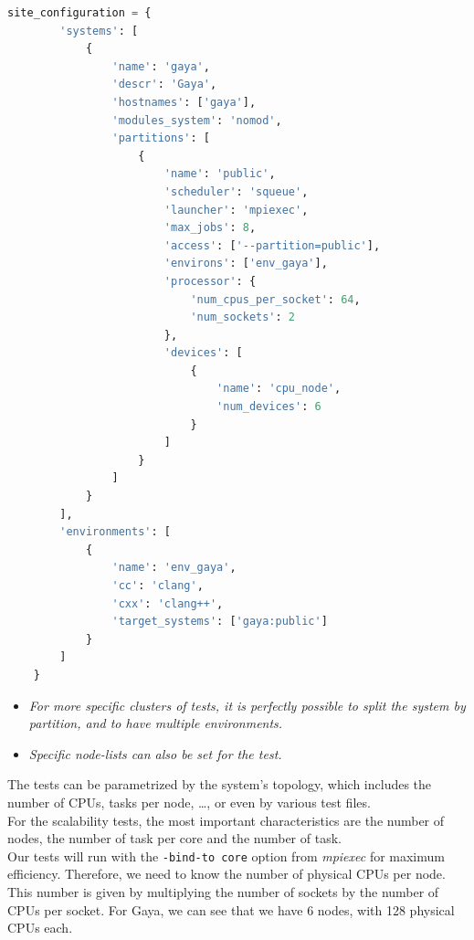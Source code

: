\documentclass[12pt]{article}
\begin{document}
\begin{lstlisting}[language=python,caption={Gaya configuration}]
site_configuration = {
        'systems': [
            {
                'name': 'gaya',
                'descr': 'Gaya',
                'hostnames': ['gaya'],
                'modules_system': 'nomod',
                'partitions': [
                    {
                        'name': 'public',
                        'scheduler': 'squeue',
                        'launcher': 'mpiexec',
                        'max_jobs': 8,
                        'access': ['--partition=public'],
                        'environs': ['env_gaya'],
                        'processor': {
                            'num_cpus_per_socket': 64,
                            'num_sockets': 2
                        },
                        'devices': [
                            {
                                'name': 'cpu_node',
                                'num_devices': 6
                            }
                        ]
                    }
                ]
            }
        ],
        'environments': [
            {
                'name': 'env_gaya',
                'cc': 'clang',
                'cxx': 'clang++',
                'target_systems': ['gaya:public']
            }
        ]
    }
\end{lstlisting}

\begin{itemize}[left=1cm]
    \item \textit{For more specific clusters of tests, it is perfectly possible to split the system by partition, and to have multiple environments.}
    \item \textit{Specific node-lists can also be set for the test.}
\end{itemize}

The tests can be parametrized by the system's topology, which includes the number of CPUs, tasks per node, \ldots, or even by various test files. \\
For the scalability tests, the most important characteristics are the number of nodes, the number of task per core and the number of task. \\

Our tests will run with the \texttt{-bind-to core} option from \textit{mpiexec} for maximum efficiency.
Therefore, we need to know the number of physical CPUs per node. This number is given by multiplying the number of sockets by the number of CPUs per socket.
For Gaya, we can see that we have 6 nodes, with 128 physical CPUs each.
\end{document}
